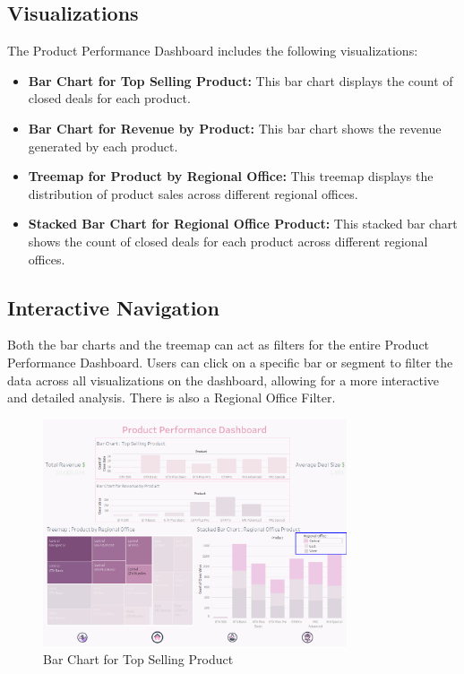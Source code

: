 \documentclass{article}
\begin{document}
\subsection{Visualizations}
The Product Performance Dashboard includes the following visualizations:
\begin{itemize}
    \item \textbf{Bar Chart for Top Selling Product:} This bar chart displays the count of closed deals for each product.
    \item \textbf{Bar Chart for Revenue by Product:} This bar chart shows the revenue generated by each product.
    \item \textbf{Treemap for Product by Regional Office:} This treemap displays the distribution of product sales across different regional offices.
    \item \textbf{Stacked Bar Chart for Regional Office Product:} This stacked bar chart shows the count of closed deals for each product across different regional offices.
\end{itemize}


\subsection{Interactive Navigation}
Both the bar charts and the treemap can act as filters for the entire Product Performance Dashboard. Users can click on a specific bar or segment to filter the data across all visualizations on the dashboard, allowing for a more interactive and detailed analysis. There is also a {Regional Office Filter}.

\begin{figure}[h!]
    \centering
    \includegraphics[width=0.8\textwidth]{resources/swappy-20240527_160008.png}
    \caption{Bar Chart for Top Selling Product}
    \label{fig:top_selling_product_bar_chart}
\end{figure}
\end{document}
